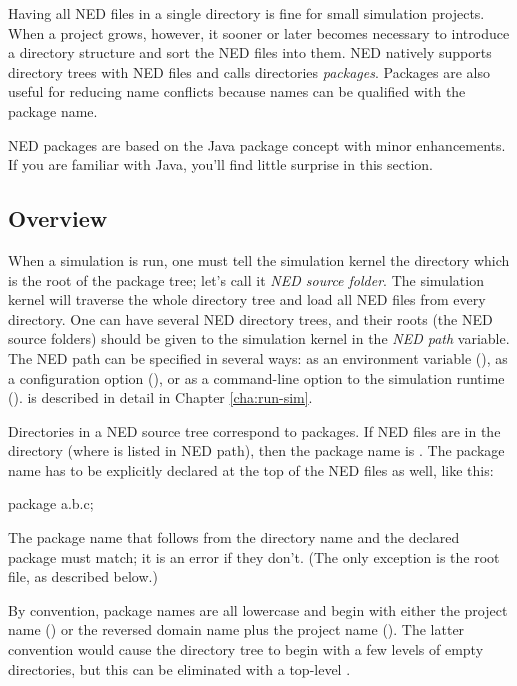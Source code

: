 Having all NED files in a single directory is fine for small simulation
projects. When a project grows, however, it sooner or later becomes necessary to
introduce a directory structure and sort the NED files into them. NED natively
supports directory trees with NED files and calls directories \textit{packages}.
Packages are also useful for reducing name conflicts because names can be
qualified with the package name.

\begin{note}
    NED packages are based on the Java package concept with minor enhancements.
    If you are familiar with Java, you'll find little surprise in this section.
\end{note}

\subsection{Overview}
\label{sec:ned-lang:packages-overview}

When a simulation is run, one must tell the simulation kernel the directory
which is the root of the package tree; let's call it \textit{NED source folder}.
The simulation kernel will traverse the whole directory tree and load all NED
files from every directory. One can have several NED directory trees, and their
roots (the NED source folders) should be given to the simulation kernel in the
\textit{NED path} variable. The NED path can be specified in several ways: as an
environment variable (), as a configuration option
(), or as a command-line option to the simulation runtime
().  is described in detail in Chapter \ref{cha:run-sim}.

Directories in a NED source tree correspond to packages. If NED files are in the
 directory (where  is listed in NED path), then
the package name is . The package name has to be explicitly declared
at the top of the NED files as well, like this:

\begin{ned}
package a.b.c;
\end{ned}

The package name that follows from the directory name and the declared package
must match; it is an error if they don't. (The only exception is the root
 file, as described below.)

By convention, package names are all lowercase and begin with either the project
name () or the reversed domain name plus the project name
(). The latter convention would cause the directory
tree to begin with a few levels of empty directories, but this can be eliminated
with a top-level .

